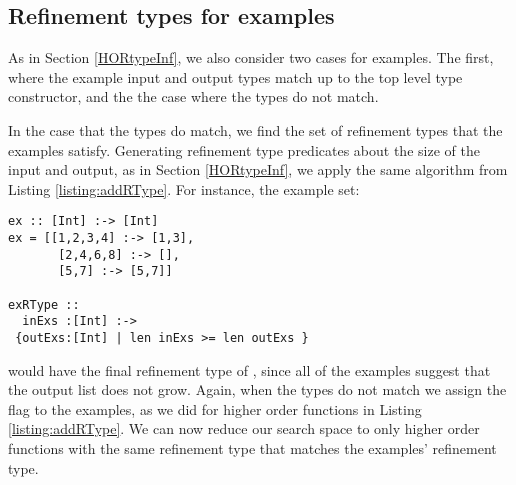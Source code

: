 \subsection{Refinement types for examples}
As in Section \ref{HORtypeInf}, we also consider two cases for examples. The first, where the example input and output types match up to the top level type constructor, and the the case where the types do not match.

In the case that the types do match, we find the set of refinement types that the examples satisfy. Generating refinement type predicates about the size of the input and output, as in Section \ref{HORtypeInf}, we apply the same algorithm from Listing \ref{listing:addRType}. For instance, the example set:

\begin{lstlisting}[caption=Refinement type inference for examples,label=exRTypeGen]
ex :: [Int] :-> [Int]
ex = [[1,2,3,4] :-> [1,3],
       [2,4,6,8] :-> [],
       [5,7] :-> [5,7]]
       
exRType ::
  inExs :[Int] :-> 
 {outExs:[Int] | len inExs >= len outExs }
\end{lstlisting}

\noindent would have the final refinement type of , since all of the examples suggest that the output list does not grow. 
Again, when the types do not match we assign the  flag to the examples, as we did for higher order functions in Listing \ref{listing:addRType}.
We can now reduce our search space to only higher order functions with the same refinement type that matches the examples' refinement type. 
